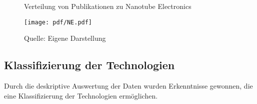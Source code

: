 \begin{figure}
	\centering
	\caption{Verteilung von Publikationen zu \glqq Nanotube Electronics\grqq}
	\texttt{[image: pdf/NE.pdf]}
	\caption*{Quelle: Eigene Darstellung}
	\label{fig:ne_pub}
\end{figure}

\subsection{Klassifizierung der Technologien}
Durch die deskriptive Auswertung der Daten wurden Erkenntnisse gewonnen, die eine Klassifizierung der Technologien ermöglichen.


